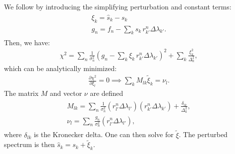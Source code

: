\documentclass[twocolumn]{aastex63}
\begin{document}
    We follow \citet{Budavari2000b} by introducing the simplifying perturbation and constant terms: 
    \begin{align}
        \begin{gathered}
            \xi_k = \hat{s}_k - s_k \\
            g_n = f_n - \sum_k s_k \, r_{k'}^n \Delta\lambda_{k'}.
        \end{gathered}
    \end{align} 
    Then, we have:
    \begin{align}
        \chi^2 = 
        \sum_n \frac{1}{\sigma_n^2} \left( g_n - \sum_k \xi_k \,  r_{k'}^n \Delta\lambda_{k'} \right)^2 +
        \sum_k \frac{\xi_k^2}{\Delta_k^2},
    \end{align}
    which can be analytically minimized:
    \begin{align}
        \frac{\partial \chi^2}{\partial \xi_l} = 0 \implies \sum_k M_{lk} \tilde{\xi}_k = \nu_l.
    \end{align}
    The matrix $M$ and vector $\nu$ are defined
    \begin{align}
        \begin{gathered}
            M_{lk} = \sum_n \frac{1}{\sigma_n^2} (r_{l'}^n \Delta\lambda_{l'}) (r_{k'}^n \Delta\lambda_{k'}) + \frac{\delta_{lk}}{\Delta_k^2}, \\
            \nu_l = \sum_n \frac{g_n}{\sigma_n^2} (r_{l'}^n \Delta\lambda_{l'}),
        \end{gathered}
    \end{align}
    where $\delta_{lk}$ is the Kronecker delta.
    One can then solve for $\tilde{\xi}$. 
    The perturbed spectrum is then $\hat{s}_k = s_k + \tilde{\xi}_k$. 
\end{document}
